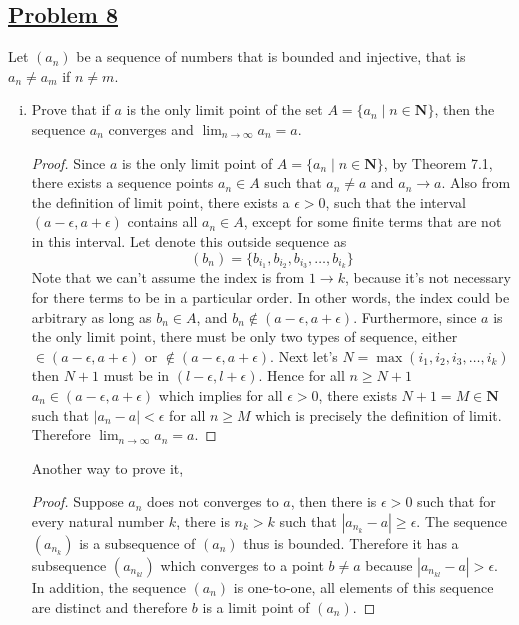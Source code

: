 \documentclass[10pt,letterpaper]{article}
\begin{document}
	\subsection*{{\color{purple}\underline{Problem 8}}}
	Let $(a_n)$ be a sequence of numbers that is bounded and injective, that is $a_n \neq a_m$ if
	$n \neq m$.
	\begin{enumerate}[(i)]
		\item Prove that if $a$ is the only limit point of the set $A = \{a_n \mid n \in \mathbf{N}\}$, then
		the sequence $a_n$ converges and $\displaystyle\lim_{n\to \infty}a_n = a$.
		\begin{proof}
		Since $a$ is the only limit point of $A = \{a_n \mid n \in \mathbf{N}\}$, by Theorem 7.1, 
		there exists a sequence points $a_n \in A$ such that $a_n \neq a$ and $a_n \rightarrow a$. 
		Also from the definition of limit point, there exists a $\epsilon > 0$, such that the interval
		$(a - \epsilon, a + \epsilon)$ contains all $a_n \in A$, except for some finite terms that are
		not in this interval. Let denote this outside sequence as 
		$$(b_n) = \{b_{i_1}, b_{i_2}, b_{i_3}, \ldots, b_{i_k}\}$$
		Note that we can't assume the index is from $1 \rightarrow k$, because it's not necessary
		for there terms to be in a particular order. In other words, the index could be arbitrary
		as long as $b_n \in A$, and $b_n \not\in (a - \epsilon, a + \epsilon)$. Furthermore,
		since $a$ is the only limit point, there must be only two types of sequence, either $\in 
		(a - \epsilon, a + \epsilon)$ or $\not\in (a - \epsilon, a + \epsilon)$.
		Next
		let's $N = \max(i_1, i_2, i_3, \ldots, i_k)$
		then $N + 1$ must be in $(l - \epsilon, l + \epsilon)$. Hence for all $n \geq N + 1$
		$a_n \in (a - \epsilon, a + \epsilon)$ which implies for all $\epsilon > 0$, there exists
		$N + 1 = M \in \mathbf{N}$ such that $|a_n - a| < \epsilon$ for all $n \geq M$ which is 
		precisely the definition of limit. Therefore $\displaystyle\lim_{n\to\infty} a_n = a$.	
		\end{proof}
		Another way to prove it,
		\begin{proof}
		Suppose $a_n$ does not converges to $a$, then there is $\epsilon > 0$ such that
		for every natural number $k$, there is $n_k > k$ such that $|a_{n_k} - a| \geq \epsilon$.
		The sequence $(a_{n_k})$ is a subsequence of $(a_n)$ thus is bounded. Therefore it has 
		a subsequence $(a_{n_{kl}})$ which converges to a point $b \neq a$ because $|a_{n_{kl}} - a| > \epsilon$.
		In addition, the sequence $(a_n)$ is one-to-one, all elements of this sequence are distinct
		and therefore $b$ is a limit point of $(a_n)$. 
		\end{proof}
		

\end{enumerate}
\end{document}
